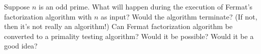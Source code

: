   Suppose $n$ is an odd prime. 
  What will happen during the execution of Fermat's factorization algorithm with $n$ as input?
  Would the algorithm terminate? (If not, then it's not really an algorithm!)
  Can Fermat factorization algorithm be converted to a primality testing algorithm?
  Would it be possible? Would it be a good idea?
